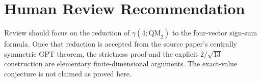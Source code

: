 \documentclass[11pt]{article}
\begin{document}
\section*{Human Review Recommendation}

Review should focus on the reduction of \(\gamma(4;\mathrm{QM}_2)\) to the four-vector
sign-sum formula.  Once that reduction is accepted from the source paper's centrally symmetric
GPT theorem, the strictness proof and the explicit \(2/\sqrt{13}\) construction are elementary
finite-dimensional arguments.  The exact-value conjecture is not claimed as proved here.
\end{document}
